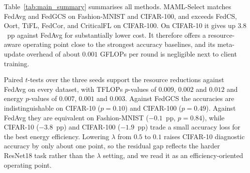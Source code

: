 \documentclass[journal]{IEEEtran}
\theoremstyle{remark}
\newcommand{\revision}[1]{#1}
\begin{document}
\revision{Table~\ref{tab:main_summary} summarises all methods. MAML-Select matches FedAvg and FedGCS on Fashion-MNIST and CIFAR-100, and exceeds FedCS, Oort, TiFL, FedCor, and CriticalFL on CIFAR-100. On CIFAR-10 it gives up $3.8$~pp against FedAvg for substantially lower cost. It therefore offers a resource-aware operating point close to the strongest accuracy baselines, and its meta-update overhead of about $0.001$ GFLOPs per round is negligible next to client training.}

\revision{Paired $t$-tests over the three seeds support the resource reductions against FedAvg on every dataset, with TFLOPs $p$-values of $0.009$, $0.002$ and $0.012$ and energy $p$-values of $0.007$, $0.001$ and $0.003$. Against FedGCS the accuracies are indistinguishable on CIFAR-10 ($p=0.10$) and CIFAR-100 ($p=0.49$). Against FedAvg they are equivalent on Fashion-MNIST ($-0.1$~pp, $p=0.84$), while CIFAR-10 ($-3.8$~pp) and CIFAR-100 ($-1.9$~pp) trade a small accuracy loss for the best energy efficiency. Lowering $\lambda$ from $0.5$ to $0.1$ raises CIFAR-10 diagnostic accuracy by only about one point, so the residual gap reflects the harder ResNet18 task rather than the $\lambda$ setting, and we read it as an efficiency-oriented operating point.}
\end{document}

